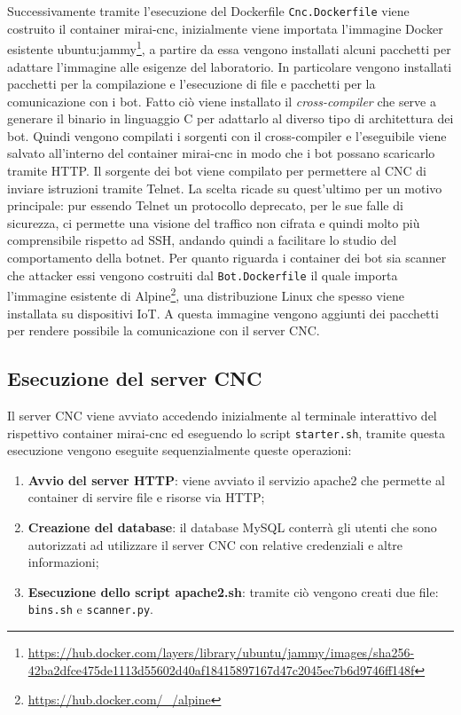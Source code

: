  Successivamente tramite l'esecuzione del Dockerfile \texttt{Cnc.Dockerfile} viene costruito il container mirai-cnc, inizialmente viene importata l'immagine Docker esistente ubuntu:jammy\footnote{\url{https://hub.docker.com/layers/library/ubuntu/jammy/images/sha256-42ba2dfce475de1113d55602d40af18415897167d47c2045ec7b6d9746ff148f}}, a partire da essa vengono installati alcuni pacchetti per adattare l'immagine alle esigenze del laboratorio. In particolare vengono installati pacchetti per la compilazione e l'esecuzione di file e pacchetti per la comunicazione con i bot. Fatto ciò viene installato il \emph{cross-compiler} che serve a generare il binario in linguaggio C per adattarlo al diverso tipo di architettura dei bot. Quindi vengono compilati i sorgenti con il cross-compiler e l'eseguibile viene salvato all'interno del container mirai-cnc in modo che i bot possano scaricarlo tramite HTTP. Il sorgente dei bot viene compilato per permettere al CNC di inviare istruzioni tramite Telnet. La scelta ricade su quest'ultimo per un motivo principale: pur essendo Telnet un protocollo deprecato, per le sue falle di sicurezza, ci permette una visione del traffico non cifrata e quindi molto più comprensibile rispetto ad SSH, andando quindi a facilitare lo studio del comportamento della botnet.
\newline
Per quanto riguarda i container dei bot sia scanner che attacker essi vengono costruiti dal \texttt{Bot.Dockerfile} il quale importa l'immagine esistente di Alpine\footnote{\url{https://hub.docker.com/_/alpine}}, una distribuzione Linux che spesso viene installata su dispositivi IoT. A questa immagine vengono aggiunti dei pacchetti per rendere possibile la comunicazione con il server CNC. 

\subsection{Esecuzione del server CNC}
Il server CNC viene avviato accedendo inizialmente al terminale interattivo del rispettivo container mirai-cnc ed eseguendo lo script \texttt{starter.sh}, tramite questa esecuzione vengono eseguite sequenzialmente queste operazioni:
\begin{enumerate}
    \item \textbf{Avvio del server HTTP}: viene avviato il servizio apache2 che permette al container di servire file e risorse via HTTP;
    \item\textbf{Creazione del database}: il database MySQL conterrà gli utenti che sono autorizzati ad utilizzare il server CNC con relative credenziali e altre informazioni;
    \item\textbf{Esecuzione dello script apache2.sh}: tramite ciò vengono creati due file: \texttt{bins.sh} e \texttt{scanner.py}.
\end{enumerate}


